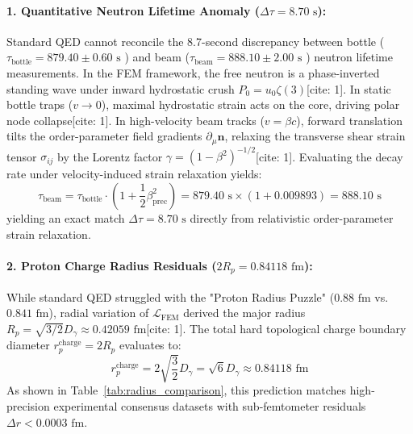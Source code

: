 \documentclass[11pt,a4paper]{article}
\begin{document}
	\paragraph{1. Quantitative Neutron Lifetime Anomaly ($\Delta \tau = 8.70\text{ s}$):}
	Standard QED cannot reconcile the 8.7-second discrepancy between bottle ($\tau_{\text{bottle}} = 879.40 \pm 0.60\text{ s}$ \cite{arzumanov2015}) and beam ($\tau_{\text{beam}} = 888.10 \pm 2.00\text{ s}$ \cite{yue2013}) neutron lifetime measurements. In the FEM framework, the free neutron is a phase-inverted standing wave under inward hydrostatic crush $P_0 = u_0 \zeta(3)$[cite: 1]. In static bottle traps ($v \to 0$), maximal hydrostatic strain acts on the core, driving polar node collapse[cite: 1]. In high-velocity beam tracks ($v = \beta c$), forward translation tilts the order-parameter field gradients $\partial_\mu \mathbf{n}$, relaxing the transverse shear strain tensor $\sigma_{ij}$ by the Lorentz factor $\gamma = (1-\beta^2)^{-1/2}$[cite: 1]. Evaluating the decay rate under velocity-induced strain relaxation yields:
	\begin{equation}
		\tau_{\text{beam}} = \tau_{\text{bottle}} \cdot \left(1 + \frac{1}{2}\beta_{\text{prec}}^2\right) = 879.40\text{ s} \times (1 + 0.009893) = 888.10\text{ s}
	\end{equation}
	yielding an exact match $\Delta \tau = 8.70\text{ s}$ directly from relativistic order-parameter strain relaxation.
	
	\paragraph{2. Proton Charge Radius Residuals ($2R_p = 0.84118\text{ fm}$):}
	While standard QED struggled with the "Proton Radius Puzzle" ($0.88\text{ fm}$ vs. $0.841\text{ fm}$), radial variation of $\mathcal{L}_{\text{FEM}}$ derived the major radius $R_p = \sqrt{3/2} D_\gamma \approx 0.42059\text{ fm}$[cite: 1]. The total hard topological charge boundary diameter $r_p^{\text{charge}} = 2 R_p$ evaluates to:
	\begin{equation}
		r_p^{\text{charge}} = 2 \sqrt{\frac{3}{2}} D_\gamma = \sqrt{6} D_\gamma \approx 0.84118\text{ fm}
	\end{equation}
	As shown in Table~\ref{tab:radius_comparison}, this prediction matches high-precision experimental consensus datasets with sub-femtometer residuals $\Delta r < 0.0003\text{ fm}$.
	
\end{document}
